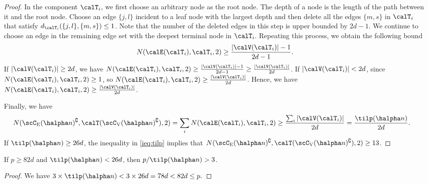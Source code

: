 \documentclass[11pt,onecolumn]{article}
\begin{document}
\begin{proof}
	In the component $\calT_{i}$, we first choose an arbitrary node as the root node. The depth of a node is the length of the path between it and the root node. Choose an edge $\{j,l\}$ 
	incident to a leaf node with the largest depth and then delete all the edges $\{m,s\}$ in $\calT_{i}$ that satisfy $d_{\calT_{i}}(\{j,l\},\{m,s\})\leq 1$. Note that the number of the deleted edges 
	in this step is upper bounded by $2d-1$. We continue to choose an edge in the remaining edge set with the deepest terminal node in $\calT_{i}$. Repeating this process, we obtain the following bound
	\begin{align}
		N(\calE(\calT_{i}),\calT_{i},2)\geq \frac{|\calV(\calT_{i})|-1}{2d-1}.
	\end{align}
	If $|\calV(\calT_{i})|\geq 2d$, we have $N(\calE(\calT_{i}),\calT_{i},2)\geq\frac{|\calV(\calT_{i})|-1}{2d-1}\geq\frac{|\calV(\calT_{i})|}{2d}$. If $|\calV(\calT_{i})|< 2d$, since $N(\calE(\calT_{i}),\calT_{i},2)\geq 1$, so $N(\calE(\calT_{i}),\calT_{i},2)\geq \frac{|\calV(\calT_{i})|}{2d}$. Hence, we have  $N(\calE(\calT_{i}),\calT_{i},2)\geq \frac{|\calV(\calT_{i})|}{2d}$.


	Finally, we have
	\begin{align}\label{ieq:tilp}
		N(\scC_{\mathrm{E}}(\halpha n)^{\complement},\calT(\scC_{\mathrm{V}}(\halpha n)^{\complement}),2)&=\sum_{i} N(\calE(\calT_{i}),\calT_{i},2)\geq \frac{\sum_{i}|\calV(\calT_{i})|}{2d}=\frac{\tilp(\halpha n)}{2d}.
	\end{align}
	If $\tilp(\halpha n)\geq 26d$, the inequality in \eqref{ieq:tilp} implies that $N(\scC_{\mathrm{E}}(\halpha n)^{\complement},\calT(\scC_{\mathrm{V}}(\halpha n)^{\complement}),2)\geq 13$.
\end{proof}

\begin{lemma}\label{lem:numsample}
	If $p\geq 82d$ and $\tilp(\halpha n)<26d$, then $p/ \tilp(\halpha n)>3$.
\end{lemma}
\begin{proof}
    We have
	$
		3\times \tilp(\halpha n) <3\times 26d=78d<82d\leq p.
	$
\end{proof}
\end{document}
